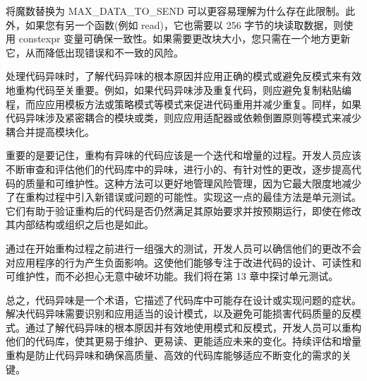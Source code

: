 
将魔数替换为 MAX\_DATA\_TO\_SEND 可以更容易理解为什么存在此限制。此外，如果您有另一个函数(例如 read)，它也需要以 256 字节的块读取数据，则使用 constexpr 变量可确保一致性。如果需要更改块大小，您只需在一个地方更新它，从而降低出现错误和不一致的风险。

处理代码异味时，了解代码异味的根本原因并应用正确的模式或避免反模式来有效地重构代码至关重要。例如，如果代码异味涉及重复代码，则应避免复制粘贴编程，而应应用模板方法或策略模式等模式来促进代码重用并减少重复。同样，如果代码异味涉及紧密耦合的模块或类，则应应用适配器或依赖倒置原则等模式来减少耦合并提高模块化。

重要的是要记住，重构有异味的代码应该是一个迭代和增量的过程。开发人员应该不断审查和评估他们的代码库中的异味，进行小的、有针对性的更改，逐步提高代码的质量和可维护性。这种方法可以更好地管理风险管理，因为它最大限度地减少了在重构过程中引入新错误或问题的可能性。实现这一点的最佳方法是单元测试。它们有助于验证重构后的代码是否仍然满足其原始要求并按预期运行，即使在修改其内部结构或组织之后也是如此。

通过在开始重构过程之前进行一组强大的测试，开发人员可以确信他们的更改不会对应用程序的行为产生负面影响。这使他们能够专注于改进代码的设计、可读性和可维护性，而不必担心无意中破坏功能。我们将在第 13 章中探讨单元测试。

总之，代码异味是一个术语，它描述了代码库中可能存在设计或实现问题的症状。解决代码异味需要识别和应用适当的设计模式，以及避免可能损害代码质量的反模式。通过了解代码异味的根本原因并有效地使用模式和反模式，开发人员可以重构他们的代码库，使其更易于维护、更易读、更能适应未来的变化。持续评估和增量重构是防止代码异味和确保高质量、高效的代码库能够适应不断变化的需求的关键。














